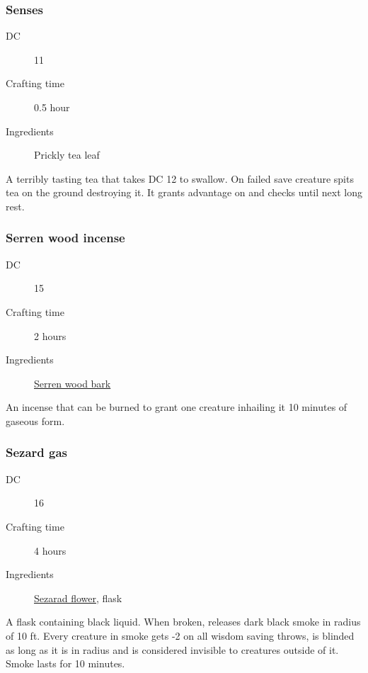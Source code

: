 \subsubsection{Senses}
\label{Senses}

\begin{description}
\item [DC] 11 \survival
\item [Crafting time] 0.5 hour
\item [Ingredients] Prickly tea leaf
\end{description}

A terribly tasting tea that takes DC 12 \constitutionsave to swallow. On failed save
creature spits tea on the ground destroying it.
It grants advantage on \perception and \investigation checks until next long rest.

\subsubsection{Serren wood incense}
\label{Serren wood incense}

\begin{description}
\item [DC] 15 \arcana
\item [Crafting time] 2 hours
\item [Ingredients] \hyperref[Serren Wood]{Serren wood bark}
\end{description}

An incense that can be burned to grant one creature inhailing it 10 minutes of gaseous form.

\subsubsection{Sezard gas}
\label{Sezard gas}

\begin{description}
\item [DC] 16 \survival
\item [Crafting time] 4 hours
\item [Ingredients] \hyperref[Sezarad]{Sezarad flower}, flask
\end{description}

A flask containing black liquid. When broken, releases dark black smoke in radius of 10 ft. 
Every creature in smoke gets -2 on all wisdom saving throws, is blinded as long as it is in radius 
and is considered invisible to creatures outside of it. Smoke lasts for 10 minutes.

